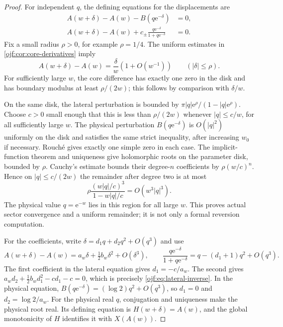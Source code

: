 \documentclass[11pt,a4paper]{article}
\numberwithin{equation}{section}
\theoremstyle{definition}\newtheorem{definition}[theorem]{Definition}
\theoremstyle{remark}\newtheorem{remark}[theorem]{Remark}
\newcommand{\ee}{\mathrm e}\newcommand{\ii}{\mathrm i}\newcommand{\dd}{\,\mathrm d}
\begin{document}
\begin{proof}
For independent $q$, the defining equations for the displacements are
\begin{align}
 A(w+\delta)-A(w)-B(q\ee^{-\delta})&=0,
                                             \label{ojf:eq:inv-physical-eq}\\
 A(w+\delta)-A(w)+c_\pm
       \frac{q\ee^{-\delta}}{1+q\ee^{-\delta}}&=0.
                                             \label{ojf:eq:inv-lateral-eq}
\end{align}
Fix a small radius $\rho>0$, for example $\rho=1/4$. The uniform
estimates in \cref{ojf:cor:core-derivatives} imply
\[
 A(w+\delta)-A(w)=\frac\delta w(1+O(w^{-1}))
                    \qquad (|\delta|\le\rho).
\]
For sufficiently large $w$, the core difference has exactly one zero
in the disk and has boundary modulus at least $\rho/(2w)$; this follows
by comparison with $\delta/w$.

On the same disk, the lateral perturbation is bounded by
$\pi |q|\ee^\rho/(1-|q|\ee^\rho)$.
Choose $c>0$ small enough that this is less than $\rho/(2w)$ whenever
$|q|\le c/w$, for all sufficiently large $w$.
The physical perturbation $B(q\ee^{-\delta})$ is $O(|q|^2)$ uniformly
on the disk and satisfies the same strict inequality, after increasing
$w_0$ if necessary. Rouch\'e gives exactly one simple zero in each case.
The implicit-function theorem and uniqueness give holomorphic roots on
the parameter disk, bounded by $\rho$.
Cauchy's estimate bounds their degree-$n$ coefficients by
$\rho(w/c)^n$. Hence on $|q|\le c/(2w)$ the remainder after degree two
is at most
\[
 \rho\frac{(w|q|/c)^3}{1-w|q|/c}=O(w^3|q|^3).
\]
The physical value $q=\ee^{-w}$ lies in this region for all large $w$.
This proves actual sector convergence and a uniform remainder; it is
not only a formal reversion computation.

For the coefficients, write $\delta=d_1q+d_2q^2+O(q^3)$ and use
\[
 A(w+\delta)-A(w)=a_w\delta+\tfrac12b_w\delta^2+O(\delta^3),
 \qquad
 \frac{q\ee^{-\delta}}{1+q\ee^{-\delta}}
       =q-(d_1+1)q^2+O(q^3).
\]
The first coefficient in the lateral equation gives $d_1=-c/a_w$.
The second gives
$a_wd_2+\tfrac12b_wd_1^2-cd_1-c=0$, which is precisely
\eqref{ojf:eq:lateral-inverse}. In the physical equation,
$B(q\ee^{-\delta})=(\log2)q^2+O(q^3)$, so $d_1=0$ and
$d_2=\log2/a_w$.
For the physical real $q$, conjugation and uniqueness make the physical
root real. Its defining equation is $H(w+\delta)=A(w)$, and the global
monotonicity of $H$ identifies it with $X(A(w))$.
\end{proof}
\end{document}
